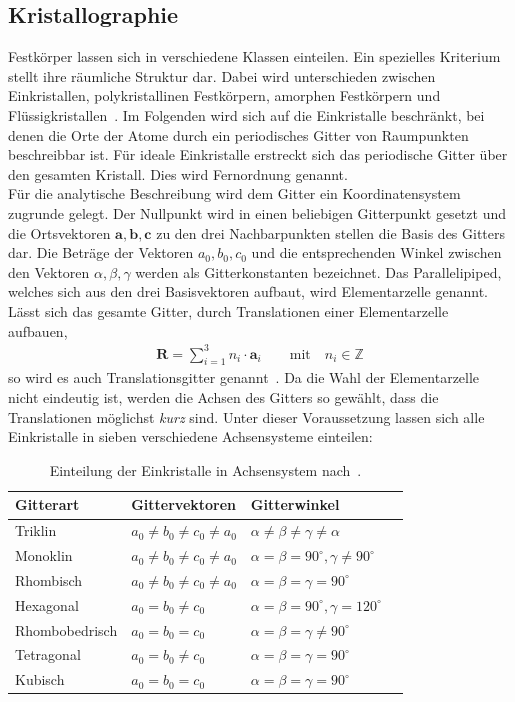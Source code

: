 \documentclass[a4paper,twoside,final]{article}
\begin{document}
\subsection{Kristallographie}
Festkörper lassen sich in verschiedene Klassen einteilen. Ein spezielles Kriterium stellt ihre räumliche Struktur dar. Dabei wird unterschieden zwischen Einkristallen, polykristallinen Festkörpern, amorphen Festkörpern und Flüssigkristallen~\cite{Demtroeder}. Im Folgenden wird sich auf die Einkristalle beschränkt, bei denen die Orte der Atome durch ein periodisches Gitter von Raumpunkten beschreibbar ist. Für ideale Einkristalle erstreckt sich das periodische Gitter über den gesamten Kristall. Dies wird Fernordnung genannt.\\
Für die analytische Beschreibung wird dem Gitter ein Koordinatensystem zugrunde gelegt. Der Nullpunkt wird in einen beliebigen Gitterpunkt gesetzt und die Ortsvektoren $\bm{a}, \bm{b}, \bm{c}$ zu den drei Nachbarpunkten stellen die Basis des Gitters dar. Die Beträge der Vektoren $a_0, b_0, c_0$ und die entsprechenden Winkel zwischen den Vektoren $\alpha, \beta, \gamma$ werden als Gitterkonstanten bezeichnet. Das Parallelipiped, welches sich aus den drei Basisvektoren aufbaut, wird Elementarzelle genannt. Lässt sich das gesamte Gitter, durch Translationen einer Elementarzelle aufbauen,
\begin{align}
  \bm{R} = \sum_{i=1}^3 n_i \cdot \bm{a}_i \qquad \text{mit}\quad n_i \in \mathbb{Z}
\end{align}
so wird es auch Translationsgitter genannt~\cite{Demtroeder}. Da die Wahl der Elementarzelle nicht eindeutig ist, werden die Achsen des Gitters so gewählt, dass die Translationen möglichst \textit{kurz} sind. Unter dieser Voraussetzung lassen sich alle Einkristalle in sieben verschiedene Achsensysteme einteilen:
\begin{table}[ht]
	\centering
	\caption{Einteilung der Einkristalle in Achsensystem nach~\cite{Kleber}.}
	\label{tab:Achsensysteme}
	\begin{tabular}{l l l l}
		\toprule
	   Gitterart & Gittervektoren & Gitterwinkel\\
	 	\midrule
			Triklin & $a_0 \neq b_0 \neq c_0 \neq a_0$ & $\alpha \neq \beta \neq \gamma\neq \alpha$\\
			Monoklin & $a_0 \neq b_0 \neq c_0 \neq a_0$ & $\alpha = \beta = 90^\circ, \gamma\neq 90^\circ$\\
      Rhombisch & $a_0 \neq b_0 \neq c_0 \neq a_0$ & $\alpha = \beta =\gamma =90^\circ$\\
      Hexagonal & $a_0 = b_0 \neq c_0$ & $\alpha = \beta = 90^\circ, \gamma = 120^\circ$\\
      Rhombobedrisch & $a_0 = b_0 = c_0$ & $\alpha = \beta =\gamma \neq 90^\circ$\\
      Tetragonal & $a_0 = b_0 \neq c_0$ & $\alpha = \beta =\gamma =90^\circ$\\
      Kubisch & $a_0 = b_0 = c_0$ & $\alpha = \beta =\gamma =90^\circ$\\
	\end{tabular}
\end{table}\\
\end{document}
